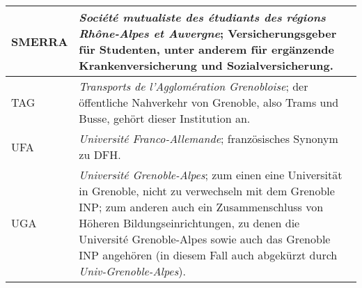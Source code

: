 \documentclass[11pt,a4paper]{article}
\begin{document}
\begin{tabularx}{\columnwidth}{|l|X|}
		SMERRA & \emph{Société mutualiste des étudiants des régions Rhône-Alpes et Auvergne}; Versicherungsgeber für Studenten, unter anderem für ergänzende Krankenversicherung und Sozialversicherung.\\ \hline
		TAG & \emph{Transports de l'Agglomération Grenobloise}; der öffentliche Nahverkehr von Grenoble, also Trams und Busse, gehört dieser Institution an.\\ \hline
		UFA & \emph{Université Franco-Allemande}; französisches Synonym zu DFH. \\ \hline
		UGA & \emph{Université Grenoble-Alpes}; zum einen eine Universität in Grenoble, nicht zu verwechseln mit dem Grenoble INP; zum anderen auch ein Zusammenschluss von Höheren Bildungseinrichtungen, zu denen die Université Grenoble-Alpes sowie auch das Grenoble INP angehören (in diesem Fall auch abgekürzt durch \emph{Univ-Grenoble-Alpes}). \\ \hline
	\end{tabularx}
	
\end{document}
